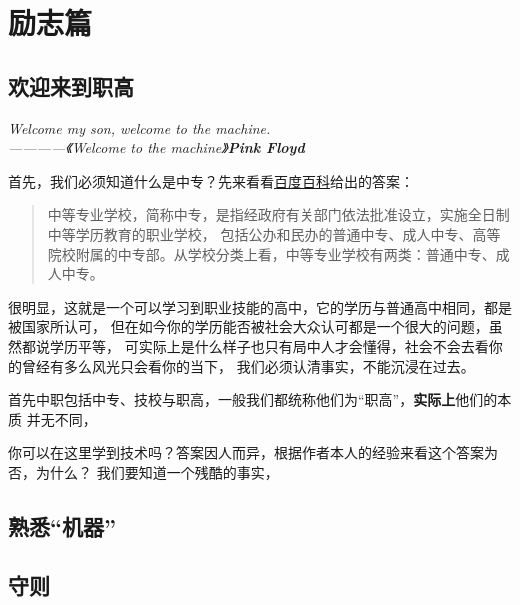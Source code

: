 \section{励志篇}

\subsection{欢迎来到职高}

\begin{center}
    \emph{Welcome my son, welcome to the machine.\\————《Welcome to the machine》\textbf{Pink Floyd}}
\end{center}

首先，我们必须知道什么是中专？先来看看\href{https://baike.baidu.com/item/%E4%B8%AD%E7%AD%89%E4%B8%93%E4%B8%9A%E5%AD%A6%E6%A0%A1/1917836}{百度百科}给出的答案：

\begin{abstract}
    中等专业学校，简称中专，是指经政府有关部门依法批准设立，实施全日制中等学历教育的职业学校，
    包括公办和民办的普通中专、成人中专、高等院校附属的中专部。从学校分类上看，中等专业学校有两类：普通中专、成人中专。
\end{abstract}

很明显，这就是一个可以学习到职业技能的高中，它的学历与普通高中相同，都是被国家所认可，
但在如今你的学历能否被社会大众认可都是一个很大的问题，虽然都说学历平等，
可实际上是什么样子也只有局中人才会懂得，社会不会去看你的曾经有多么风光只会看你的当下，
我们必须认清事实，不能沉浸在过去。

首先中职包括中专、技校与职高，一般我们都统称他们为“职高”，\textbf{实际上}他们的本质
并无不同，

你可以在这里学到技术吗？答案因人而异，根据作者本人的经验来看这个答案为否，为什么？
我们要知道一个残酷的事实，

\subsection{熟悉“机器”}

\subsection{守则}